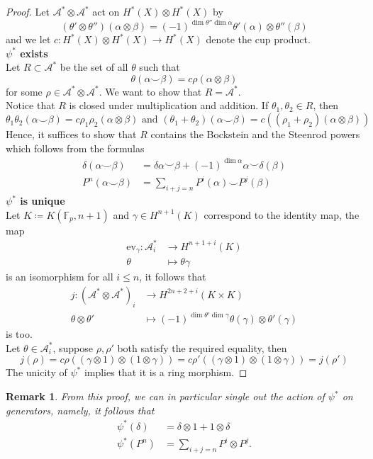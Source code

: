\documentclass[11pt, a4paper]{article}
\newcommand{\ev}{\mathrm{ev}}
\newtheorem{rmk}[thm]{Remark}
\theoremstyle{plain}
\newtheorem*{proof}{Proof}
\begin{document}
\begin{proof}
Let $\mathcal{A}^{\ast}\otimes \mathcal{A}^{\ast}$ act on $H^{\ast}( X) \otimes H^{\ast}( X) $ by
\[ 
( \theta'\otimes\theta'' )( \alpha\otimes \beta) = ( -1)^{\dim \theta''\dim \alpha}\theta'( \alpha) \otimes \theta''( \beta) 
\]
and we let $c: H^{\ast}( X) \otimes H^{\ast}( X) \to H^{\ast}( X) $ denote the cup product.\\
\textbf{$\psi^{\ast}$ exists}\\
Let $R \subset \mathcal{A}^{\ast}$ be the set of all $\theta$ such that 
\[ 
\theta( \alpha\smile \beta) = c \rho ( \alpha\otimes \beta) 
\]
for some $\rho \in \mathcal{A}^{\ast}\otimes \mathcal{A}^{\ast}$. We want to show that $R = \mathcal{A}^{\ast}$.\\
Notice that $R$ is closed under multiplication and addition. If $\theta_1, \theta_2\in R$, then 
\[ 
	\theta_1\theta_2( \alpha\smile \beta) = c\rho_1\rho_2( \alpha\otimes \beta) \text{ and } 	( \theta_1 + \theta_2) ( \alpha\smile\beta) = c (  ( \rho_1 + \rho_2 )( \alpha \otimes \beta ) )
\]
Hence, it suffices to show that $R$ contains the Bockstein and the Steenrod powers which follows from the formulas
\begin{align*}
	\delta( \alpha\smile \beta) &= \delta \alpha\smile \beta + ( -1)^{\dim \alpha}\alpha \smile \delta( \beta) \\
	P^{n}( \alpha\smile \beta) &= \sum_{i+j =n}  P^{i}( \alpha) \smile P^{j}( \beta) 
\end{align*}
\textbf{$\psi^{\ast}$ is unique}\\
Let $K \coloneq K( \mathbb{F}_p, n+1) $ and $\gamma \in H^{n+1}( K) $ correspond to the identity map, the map
\begin{align*}
	\ev_{\gamma} \colon \mathcal{A}^{\ast}_i &\to H^{n+1+i}( K) \\
	\theta &\mapsto \theta\gamma
\end{align*}
is an isomorphism for all $i \leq n$, it follows that
\begin{align*}
	j\colon \left( \mathcal{A}^{\ast} \otimes \mathcal{A}^{\ast} \right)_i &\to H^{2n+2+i}( K\times K) \\
	\theta\otimes \theta'&\mapsto ( -1)^{\dim\theta'\dim\gamma} \theta( \gamma) \otimes \theta'( \gamma) 
\end{align*}
is too.\\
Let $\theta\in \mathcal{A}^{\ast}_i$, suppose $\rho, \rho'$ both satisfy the required equality, then
\[ 
j( \rho) =c\rho\left( ( \gamma\otimes 1) \otimes ( 1\otimes \gamma) \right) = c\rho'\left( ( \gamma\otimes 1)\otimes ( 1\otimes \gamma)  \right) =j(\rho' ) 
\]
The unicity of $\psi^{\ast}$ implies that it is a ring morphism.
\end{proof}
\begin{rmk}\label{rmk_psi_dual}
From this proof, we can in particular single out the action of $\psi^{\ast}$ on generators, namely, it follows that 
\begin{align*}
	\psi^{\ast}( \delta) &= \delta\otimes 1 + 1 \otimes \delta\\
	\psi^{\ast}( P^{n}) &= \sum_{i+j=n} P^{i}\otimes P^{j}.
\end{align*}
\end{rmk}
\end{document}
